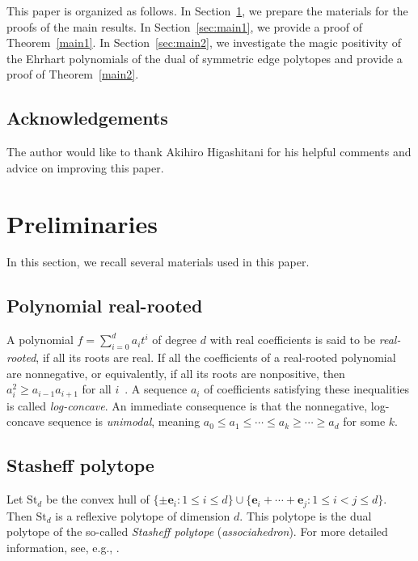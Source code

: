 \documentclass[a4paper,reqno,11pt, oneside]{amsart}
\newcommand{\eb}{\mathbf{e}}
\theoremstyle{definition}
\theoremstyle{remark}
\begin{document}
This paper is organized as follows. 
In Section~\ref{sec:pre}, we prepare the materials for the proofs of the main results. 
In Section~\ref{sec:main1}, we provide a proof of Theorem~\ref{main1}. 
In Section~\ref{sec:main2}, we investigate the magic positivity of the Ehrhart polynomials of the dual of symmetric edge polytopes and provide a proof of Theorem~\ref{main2}. 

\subsection*{Acknowledgements}
The author would like to thank Akihiro Higashitani for his helpful comments and advice on improving this paper.

\medskip



\section{Preliminaries}\label{sec:pre}

In this section, we recall several materials used in this paper. 

\subsection{Polynomial real-rooted}
A polynomial $f=\sum_{i=0} ^d a_i t^i$ of degree $d$ with real coefficients is said to be \textit{real-rooted}, if all its roots are real. If all the coefficients of a real-rooted polynomial are nonnegative, or equivalently, if all its roots are nonpositive, then $a_i^2\geq a_{i-1}a_{i+1}$ for all $i$~\cite{RS89}. A sequence $a_i$ of coefficients satisfying these inequalities is called \textit{log-concave}. An immediate consequence is that the nonnegative, log-concave sequence is \textit{unimodal}, meaning $a_0\leq a_1\leq \cdots \leq a_k \geq \cdots \geq a_d$ for some $k$. 


\subsection{Stasheff polytope}
Let $\mathrm{St}_d$ be the convex hull of $\{ \pm \eb_i : 1 \leq i \leq d\} \cup \{\eb_i+\cdots+\eb_j : 1 \leq i < j \leq d\}$. 
Then $\mathrm{St}_d$ is a reflexive polytope of dimension $d$. 
This polytope is the dual polytope of the so-called  \textit{Stasheff polytope} (\textit{associahedron}). 
For more detailed information, see, e.g., \cite{FZ}.
\end{document}
